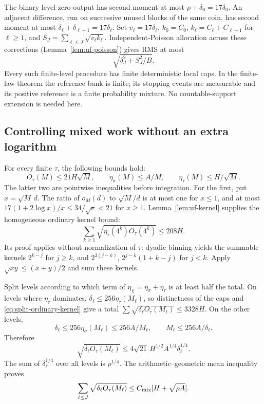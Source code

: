 The binary level-zero output has second moment at most
$\rho+\delta_0=17\delta_0$. An adjacent difference, run on successive
unused blocks of the same coin, has second moment at most
$\delta_\ell+\delta_{\ell-1}=17\delta_\ell$.
Set $v_\ell=17\delta_\ell$, $k_0=C_0$,
$k_\ell=C_\ell+C_{\ell-1}$ for $\ell\ge1$, and
$S_J=\sum_{\ell\le J}\sqrt{v_\ell k_\ell}$.
Independent-Poisson allocation across these corrections
(Lemma~\ref{lem:uf-poisson})
gives RMS at most
\begin{equation}\label{eq:split-poisson}
 \sqrt{\delta_J^2+S_J^2/B}.
\end{equation}
Every such finite-level procedure has finite deterministic local caps.
In the finite-law theorem the reference bank is finite; its stopping
events are measurable and its positive reference is a finite probability
mixture. No countable-support extension is needed here.

\subsection{Controlling mixed work without an extra logarithm}

For every finite $\tau$, the following bounds hold:
\begin{equation}\label{eq:split-elementary-kernels}
 O_\tau(M)\le21H\sqrt M,\qquad
 \eta_\sigma(M)\le A/M,\qquad
 \eta_\tau(M)\le H/\sqrt M.
\end{equation}
The latter two are pointwise inequalities before integration.
For the first, put $x=\sqrt M\,d$. The ratio of $o_M(d)$ to
$\sqrt M/d$ is at most one for $x\le1$, and at most
$17(1+2\log x)/x\le34/\sqrt e<21$ for $x\ge1$.
Lemma~\ref{lem:uf-kernel} supplies the homogeneous ordinary kernel bound:
\begin{equation}\label{eq:split-ordinary-kernel}
 \sum_{k\ge1}\sqrt{\eta_\tau(4^k)O_\tau(4^k)}\le 208H.
\end{equation}
Its proof applies without normalization of $\tau$: dyadic binning yields
the summable kernels $2^{k-j}$ for $j\ge k$, and
$2^{3(j-k)}$, $2^{j-k}(1+k-j)$ for $j<k$.
Apply $\sqrt{xy}\le(x+y)/2$ and sum these kernels.

Split levels according to which term of
$\eta_\chi=\eta_\sigma+\eta_\tau$ is at least half the total.
On levels where $\eta_\tau$ dominates,
$\delta_\ell\le256\eta_\tau(M_\ell)$, so distinctness of the caps and
\eqref{eq:split-ordinary-kernel} give a total
$\sum\sqrt{\delta_\ell O_\tau(M_\ell)}\le3328H$.
On the other levels,
\[
 \delta_\ell\le256\eta_\sigma(M_\ell)\le256A/M_\ell,
 \qquad M_\ell\le256A/\delta_\ell.
\]
Therefore
\[
 \sqrt{\delta_\ell O_\tau(M_\ell)}
 \le4\sqrt{21}\,H^{1/2}A^{1/4}\delta_\ell^{1/4}.
\]
The sum of $\delta_\ell^{1/4}$ over all levels is $\rho^{1/4}$.
The arithmetic--geometric mean inequality proves
\begin{equation}\label{eq:split-mixed-sum}
 \sum_{\ell\le J}\sqrt{\delta_\ell O_\tau(M_\ell)}
 \le C_{\rm mix}[H+\sqrt{\rho A}].
\end{equation}

